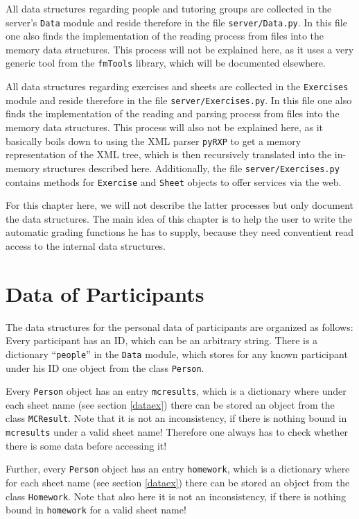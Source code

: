 \documentclass[12pt,openany,a4paper]{book}
\begin{document}
All data structures regarding people and tutoring groups are collected in
the server's \texttt{Data} module and reside therefore in the file
\texttt{server/Data.py}. In this file one also finds the implementation
of the reading process from files into the memory data structures.
This process will not be explained here, as it uses a very generic
tool from the \texttt{fmTools} library, which will be documented elsewhere.

All data structures regarding exercises and sheets are collected in the
\texttt{Exercises} module and reside therefore in the file
\texttt{server/Exercises.py}. In this file one also finds the
implementation of the reading and parsing process from files into the 
memory data structures. This process will also not be explained here, as it
basically boils down to using the XML parser \texttt{pyRXP} to get a
memory representation of the XML tree, which is then recursively translated
into the in-memory structures described here. Additionally, the file
\texttt{server/Exercises.py} contains methods for \texttt{Exercise} and
\texttt{Sheet} objects to offer services via the web.

For this chapter here, we will not describe the latter processes but only
document the data structures. The main idea of this chapter is to help
the user to write the automatic grading functions he has to supply, because
they need conventient read access to the internal data structures.

\section{Data of Participants}

The data structures for the personal data of participants are organized
as follows: Every participant has an ID, which can be an arbitrary string.
There is a dictionary ``\texttt{people}'' in the \texttt{Data} module,
which stores for any known participant under his ID one object from the
class \texttt{Person}.

Every \texttt{Person} object has an entry \texttt{mcresults}, which is a
dictionary where under each sheet name (see section \ref{dataex}) there
can be stored an object from the class \texttt{MCResult}. Note that it
is not an inconsistency, if there is nothing bound in \texttt{mcresults}
under a valid sheet name! Therefore one always has to check whether there
is some data before accessing it!

Further, every \texttt{Person} object has an entry \texttt{homework},
which is a dictionary where for each sheet name (see section
\ref{dataex}) there can be stored an object from the class
\texttt{Homework}. Note that also here it is not an inconsistency, if
there is nothing bound in \texttt{homework} for a valid sheet name!
\end{document}
